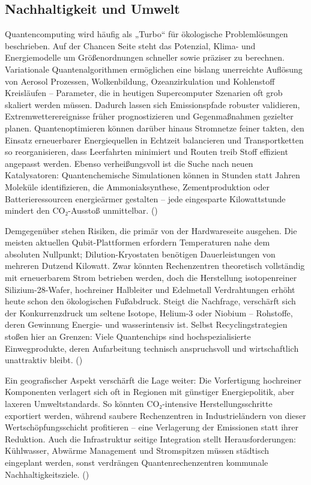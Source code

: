 \subsection{Nachhaltigkeit und Umwelt}
Quantencomputing wird häufig als „Turbo“ für ökologische Problemlösungen beschrieben. Auf der Chancen Seite steht das Potenzial, Klima- und Energiemodelle um Größenordnungen schneller sowie präziser zu berechnen. Variationale Quantenalgorithmen ermöglichen eine bislang unerreichte Auflösung von Aerosol Prozessen, Wolkenbildung, Ozeanzirkulation und Kohlenstoff Kreisläufen – Parameter, die in heutigen Supercomputer Szenarien oft grob skaliert werden müssen. Dadurch lassen sich Emissionspfade robuster validieren, Extremwetterereignisse früher prognostizieren und Gegenmaßnahmen gezielter planen. Quantenoptimieren können darüber hinaus Stromnetze feiner takten, den Einsatz erneuerbarer Energiequellen in Echtzeit balancieren und Transportketten so reorganisieren, dass Leerfahrten minimiert und Routen treib Stoff effizient angepasst werden. Ebenso verheißungsvoll ist die Suche nach neuen Katalysatoren: Quantenchemische Simulationen können in Stunden statt Jahren Moleküle identifizieren, die Ammoniaksynthese, Zementproduktion oder Batterieressourcen energieärmer gestalten – jede eingesparte Kilowattstunde mindert den CO₂-Ausstoß unmittelbar. (\cite{schwabeOpportunitiesChallengesQuantum2025a})

Demgegenüber stehen Risiken, die primär von der Hardwareseite ausgehen. Die meisten aktuellen Qubit-Plattformen erfordern Temperaturen nahe dem absoluten Nullpunkt; Dilution-Kryostaten benötigen Dauerleistungen von mehreren Dutzend Kilowatt. Zwar könnten Rechenzentren theoretisch vollständig mit erneuerbarem Strom betrieben werden, doch die Herstellung isotopenreiner Silizium-28-Wafer, hochreiner Halbleiter und Edelmetall Verdrahtungen erhöht heute schon den ökologischen Fußabdruck. Steigt die Nachfrage, verschärft sich der Konkurrenzdruck um seltene Isotope, Helium-3 oder Niobium – Rohstoffe, deren Gewinnung Energie- und wasserintensiv ist. Selbst Recyclingstrategien stoßen hier an Grenzen: Viele Quantenchips sind hochspezialisierte Einwegprodukte, deren Aufarbeitung technisch anspruchsvoll und wirtschaftlich unattraktiv bleibt. (\cite{rootQuantumTechnologiesContext2025})

Ein geografischer Aspekt verschärft die Lage weiter: Die Vorfertigung hochreiner Komponenten verlagert sich oft in Regionen mit günstiger Energiepolitik, aber laxeren Umweltstandards. So könnten CO₂-intensive Herstellungsschritte exportiert werden, während saubere Rechenzentren in Industrieländern von dieser Wertschöpfungsschicht profitieren – eine Verlagerung der Emissionen statt ihrer Reduktion. Auch die Infrastruktur seitige Integration stellt Herausforderungen: Kühlwasser, Abwärme Management und Stromspitzen müssen städtisch eingeplant werden, sonst verdrängen Quantenrechenzentren kommunale Nachhaltigkeitsziele. (\cite{rootQuantumTechnologiesContext2025})

